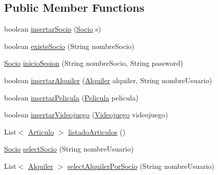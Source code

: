 \subsection*{Public Member Functions}
\begin{DoxyCompactItemize}
\item 
boolean \mbox{\hyperlink{interfacees_1_1deusto_1_1server_1_1db_1_1_i_d_a_o_a4b6652c5bec131e374c2243b579ea4cf}{insertar\+Socio}} (\mbox{\hyperlink{classes_1_1deusto_1_1client_1_1data_1_1_socio}{Socio}} s)
\item 
boolean \mbox{\hyperlink{interfacees_1_1deusto_1_1server_1_1db_1_1_i_d_a_o_a376e9e8f235b13262d5b63541aeb3fd1}{existe\+Socio}} (String nombre\+Socio)
\item 
\mbox{\hyperlink{classes_1_1deusto_1_1client_1_1data_1_1_socio}{Socio}} \mbox{\hyperlink{interfacees_1_1deusto_1_1server_1_1db_1_1_i_d_a_o_a5ec0443a5c196f3545f89c3716450e42}{inicio\+Sesion}} (String nombre\+Socio, String password)
\item 
boolean \mbox{\hyperlink{interfacees_1_1deusto_1_1server_1_1db_1_1_i_d_a_o_a3a79fb98127799a4f66c0a90006b0311}{insertar\+Alquiler}} (\mbox{\hyperlink{classes_1_1deusto_1_1client_1_1data_1_1_alquiler}{Alquiler}} alquiler, String nombre\+Usuario)
\item 
boolean \mbox{\hyperlink{interfacees_1_1deusto_1_1server_1_1db_1_1_i_d_a_o_ad193e4bfd067962ac138c13af0b786b4}{insertar\+Pelicula}} (\mbox{\hyperlink{classes_1_1deusto_1_1client_1_1data_1_1_pelicula}{Pelicula}} pelicula)
\item 
boolean \mbox{\hyperlink{interfacees_1_1deusto_1_1server_1_1db_1_1_i_d_a_o_a6c40abe1ba302500ec0070a50c234ecf}{insertar\+Videojuego}} (\mbox{\hyperlink{classes_1_1deusto_1_1client_1_1data_1_1_videojuego}{Videojuego}} videojuego)
\item 
List$<$ \mbox{\hyperlink{classes_1_1deusto_1_1client_1_1data_1_1_articulo}{Articulo}} $>$ \mbox{\hyperlink{interfacees_1_1deusto_1_1server_1_1db_1_1_i_d_a_o_a7c573cd5b9d26960fc8eeeec4db1e5e5}{listado\+Articulos}} ()
\item 
\mbox{\hyperlink{classes_1_1deusto_1_1client_1_1data_1_1_socio}{Socio}} \mbox{\hyperlink{interfacees_1_1deusto_1_1server_1_1db_1_1_i_d_a_o_ab8bc0f83a9306dbd0f98601420cac890}{select\+Socio}} (String nombre\+Usuario)
\item 
List$<$ \mbox{\hyperlink{classes_1_1deusto_1_1client_1_1data_1_1_alquiler}{Alquiler}} $>$ \mbox{\hyperlink{interfacees_1_1deusto_1_1server_1_1db_1_1_i_d_a_o_ab8723905772b63f54902859f45bd121b}{select\+Alquiler\+Por\+Socio}} (String nombre\+Usuario)

\end{DoxyCompactItemize}
